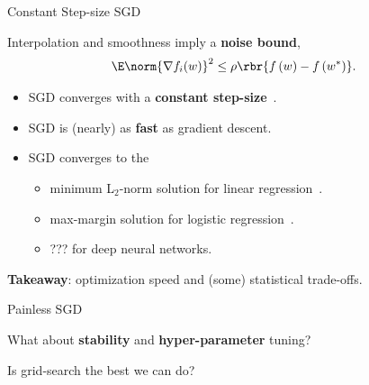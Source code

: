 \documentclass[notheorems]{beamer}
\begin{document}
    \begin{frame}{Constant Step-size SGD}

        Interpolation and smoothness imply a \textbf{noise bound},
        \begin{align*}
            \E \norm{\nabla f_i (w)}^2 \leq \rho \rbr{f\,(w) - f\,(w^*)}.
        \end{align*}

        \begin{itemize}
            \item SGD converges with a \textbf{constant step-size}~\citep{vaswani2019fast, bassily2018exponential}.
            \item SGD is (nearly) as \textbf{fast} as gradient descent.
            \item SGD converges to the
            \begin{itemize} \normalsize
                \item minimum L$_2$-norm solution for linear regression~\citep{wilson2017marginal}.
                \item max-margin solution for logistic regression~\citep{nacson2018stochastic}.
                \item ??? for deep neural networks.\vspace{1em}
            \end{itemize}
        \end{itemize}

        \textbf{Takeaway}: optimization speed and (some) statistical trade-offs.\\
        \vspace{0.1cm}

    \end{frame}

    \begin{frame}{Painless SGD}

        \begin{center}
            {\huge What about \textbf{stability} and \textbf{hyper-parameter} tuning?}

            \vspace{2em}
            {\Large Is grid-search the best we can do?}
            \vspace{2em}
        \end{center}

        \begin{figure}
        \end{figure}

    \end{frame}
\end{document}

